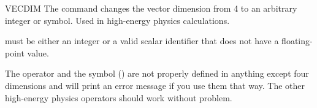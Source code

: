 \begin{Command}{VECDIM}
The command  changes the vector dimension from 4 to an arbitrary
integer or symbol.  Used in high-energy physics calculations.
\begin{Syntax}
 
\end{Syntax}


 must be either an integer or a valid scalar identifier that
does not have a floating-point value.

\begin{Comments}
The  operator and the 
symbol () are not properly defined in anything except four
dimensions and will print an error message if you use them that way.  The
other high-energy physics operators should work without problem.
\end{Comments}
\end{Command}


